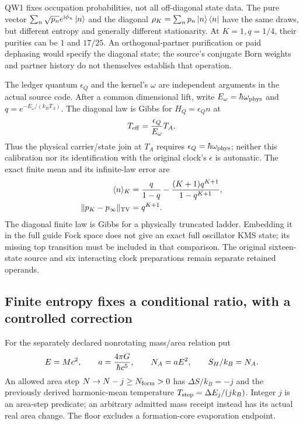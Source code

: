 \documentclass[10pt,twocolumn,letterpaper]{article}
\newcommand{\ii}{\mathrm{i}}
\renewcommand{\hbar}{\mathchar'26\mkern-9mu h}
\begin{document}
QW1 fixes occupation probabilities, not all off-diagonal state data.
The pure vector $\sum_n\sqrt{p_n}e^{\ii\phi_n}\ket n$ and the diagonal
$\rho_K=\sum_np_n\ket n\bra n$ have the same draws, but different entropy
and generally different stationarity. At $K=1,q=1/4$, their purities can
be $1$ and $17/25$. An orthogonal-partner purification or paid dephasing
would specify the diagonal state; the source's conjugate Born weights
and partner history do not themselves establish that operation.

The ledger quantum $\epsilon_Q$ and the kernel's $\omega$ are independent
arguments in the actual source code. After a common dimensional lift,
write $E_\omega=\hbar\omega_{\rm phys}$ and
$q=e^{-E_\omega/(k_BT_A)}$. The diagonal law is Gibbs for
$H_Q=\epsilon_Q n$ at
\begin{equation}
 T_{\rm eff}=\frac{\epsilon_Q}{E_\omega}T_A .
\end{equation}
Thus the physical carrier/state join at $T_A$ requires
$\epsilon_Q=\hbar\omega_{\rm phys}$; neither this calibration nor its
identification with the original clock's $\epsilon$ is automatic.
The exact finite mean and its infinite-law error are
\begin{equation}
 \begin{split}
 \langle n\rangle_K&=\frac q{1-q}
       -\frac{(K+1)q^{K+1}}{1-q^{K+1}},\\
 \|p_K-p_\infty\|_{\rm TV}&=q^{K+1}.
 \end{split}
\end{equation}
The diagonal finite law is Gibbs for a physically truncated ladder.
Embedding it in the full guide Fock space does not give an exact full
oscillator KMS state; its missing top transition must be included in
that comparison. The original sixteen-state source and six interacting
clock preparations remain separate retained operands.

\subsection{Finite entropy fixes a conditional ratio, with a controlled correction}
For the separately declared nonrotating mass/area relation put
\begin{equation}
 E=Mc^2,\qquad a=\frac{4\pi G}{\hbar c^5},\qquad
 N_A=aE^2,\qquad S_H/k_B=N_A .
\end{equation}
An allowed area step $N\to N-j\ge N_{\rm form}>0$ has
$\Delta S/k_B=-j$ and the previously derived harmonic-mean temperature
$T_{\rm step}=\Delta E_j/(jk_B)$. Integer $j$ is an area-step predicate;
an arbitrary admitted mass receipt instead has its actual real area change.
The floor excludes a formation-core evaporation endpoint.
\end{document}
